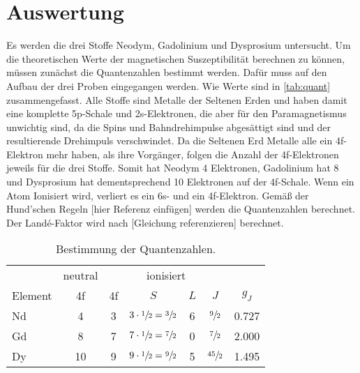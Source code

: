\section{Auswertung}
\label{sec:Auswertung}
Es werden die drei Stoffe Neodym, Gadolinium und Dysprosium untersucht. Um die theoretischen Werte der magnetischen Suszeptibilität berechnen zu können, müssen zunächst die Quantenzahlen bestimmt werden.
Dafür muss auf den Aufbau der drei Proben eingegangen werden. Wie Werte sind in \autoref{tab:quant} zusammengefasst.
Alle Stoffe sind Metalle der Seltenen Erden und haben damit eine komplette 5p-Schale und 2s-Elektronen, die aber für den Paramagnetismus unwichtig sind, da die Spins und Bahndrehimpulse abgesättigt sind
und der resultierende Drehimpuls verschwindet. Da die Seltenen Erd Metalle alle ein 4f-Elektron mehr haben, als ihre Vorgänger, folgen die Anzahl der 4f-Elektronen jeweils für die drei Stoffe.
Somit hat Neodym 4 Elektronen, Gadolinium hat 8  und Dysprosium hat dementsprechend 10 Elektronen auf der 4f-Schale.
Wenn ein Atom Ionisiert wird, verliert es ein 6s- und ein 4f-Elektron.
Gemäß der Hund'schen Regeln [hier Referenz einfügen] werden die Quantenzahlen berechnet.
Der Landé-Faktor wird nach [Gleichung referenzieren] berechnet.

\begin{table}%
  \centering
  \caption{Bestimmung der Quantenzahlen.}
  \label{tab:quant}
  \begin{tabular}{l c c c c c c}
      \toprule
       & 
      neutral & 
      \multicolumn{4}{c}{ionisiert} \\
      \cmidrule(lr){2-2} \cmidrule(lr){3-7}
      Element &
      4f & 
      4f &
      $S$ & 
      $L$ & 
      $J$ &
      $g_J$ \\
      \midrule
      Nd &  4 & 3 & $3\cdot\sfrac{1}{2}=\sfrac{3}{2}$ & 6 & $\sfrac{9}{2}$  & 0.727 \\
      Gd &  8 & 7 & $7\cdot\sfrac{1}{2}=\sfrac{7}{2}$ & 0 & $\sfrac{7}{2}$ & 2.000 \\
      Dy & 10 & 9 & $9\cdot\sfrac{1}{2}=\sfrac{9}{2}$ & 5 & $\sfrac{45}{2}$ & 1.495 \\
      \bottomrule
  \end{tabular}
\end{table}

